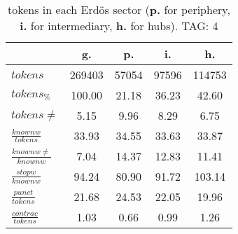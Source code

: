 \begin{table}[h!]
\begin{center}
\begin{tabular}{| l || c | c | c | c |}\hline
 & {\bf g.} & {\bf p.} & {\bf i.} & {\bf h.} \\\hline\hline
$tokens$ & 269403  & 57054  & 97596  & 114753 \\
$tokens_{\%}$ & 100.00  & 21.18  & 36.23  & 42.60 \\
$tokens \neq$ & 5.15  & 9.96  & 8.29  & 6.75 \\\hline
$\frac{knownw}{tokens}$ & 33.93  & 34.55  & 33.63  & 33.87 \\
$\frac{knownw \neq}{knownw}$ & 7.04  & 14.37  & 12.83  & 11.41 \\\hline
$\frac{stopw}{knownw}$ & 94.24  & 80.90  & 91.72  & 103.14 \\
$\frac{punct}{tokens}$ & 21.68  & 24.53  & 22.05  & 19.96 \\
$\frac{contrac}{tokens}$ & 1.03  & 0.66  & 0.99  & 1.26 \\\hline
\end{tabular}
\caption{tokens in each Erd\"os sector ({{\bf p.}} for periphery, {{\bf i.}} for intermediary, 
    {{\bf h.}} for hubs). TAG: 4}
\end{center}
\end{table}